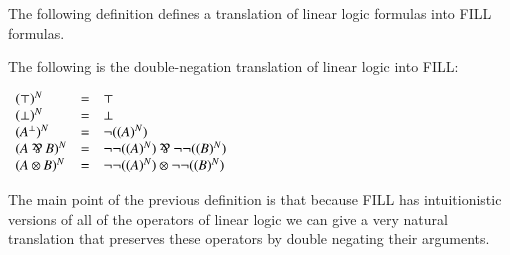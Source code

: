 \documentclass{elsarticle}
\newcommand{\FILLnt}[1]{\mathit{#1}}
\newcommand{\FILLsym}[1]{#1}
\begin{document}
The following definition defines a translation of linear logic formulas into FILL formulas.
\begin{definition}
  \label{def:ll-to-fill}
  The following is the double-negation translation of linear logic
  into FILL:
  \begin{center}
  \begin{math}
    \begin{array}{lll}
       (  \top  )^N  & = &  \top \\
       (  \perp  )^N  & = &  \perp \\
       (  \FILLnt{A} ^{\perp}  )^N  & = &  \lnot  \FILLsym{(}   ( \FILLnt{A} )^N   \FILLsym{)} \\
       (  \FILLnt{A}  \parr  \FILLnt{B}  )^N  & = &    \lnot    \lnot  \FILLsym{(}   ( \FILLnt{A} )^N   \FILLsym{)}      \parr   \lnot    \lnot  \FILLsym{(}   ( \FILLnt{B} )^N   \FILLsym{)}    \\
       (  \FILLnt{A}  \otimes  \FILLnt{B}  )^N  & = &    \lnot    \lnot  \FILLsym{(}   ( \FILLnt{A} )^N   \FILLsym{)}      \otimes   \lnot    \lnot  \FILLsym{(}   ( \FILLnt{B} )^N   \FILLsym{)}    \\
    \end{array}
  \end{math}
\end{center}
\end{definition}
\noindent
The main point of the previous definition is that because FILL has
intuitionistic versions of all of the operators of linear logic we can
give a very natural translation that preserves these operators by
double negating their arguments.  
\end{document}
